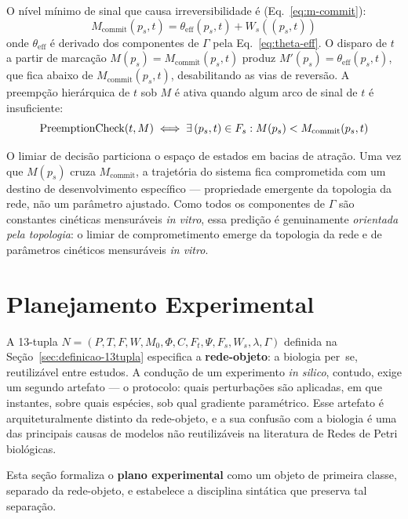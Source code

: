 \begin{definition}
\label{def:limiar-decisao}
O nível mínimo de sinal que causa irreversibilidade é (Eq.~\eqref{eq:m-commit}):
\[
M_{\text{commit}}(p_s, t) = \theta_{\mathrm{eff}}(p_s,t) + W_s((p_s,t))
\]
onde $\theta_{\mathrm{eff}}$ é derivado dos componentes de $\Gamma$ pela
Eq.~\eqref{eq:theta-eff}.
O disparo de $t$ a partir de marcação $M(p_s) = M_{\text{commit}}(p_s,t)$
produz $M'(p_s) = \theta_{\mathrm{eff}}(p_s,t)$, que fica abaixo de
$M_{\text{commit}}(p_s,t)$, desabilitando as vias de reversão.
A preempção hierárquica de $t$ sob $M$ é ativa quando algum arco de sinal
de $t$ é insuficiente:
\[
\operatorname{PreemptionCheck}(t, M) \iff \exists\, (p_s, t) \in F_s : M(p_s) < M_{\text{commit}}(p_s, t)
\]
\end{definition}

O limiar de decisão particiona o espaço de estados em bacias de atração.
Uma vez que $M(p_s)$ cruza $M_{\text{commit}}$, a trajetória do sistema fica
comprometida com um destino de desenvolvimento específico --- propriedade
emergente da topologia da rede, não um parâmetro ajustado.  Como todos os
componentes de $\Gamma$ são constantes cinéticas mensuráveis \emph{in vitro},
essa predição é genuinamente \emph{orientada pela topologia}: o limiar de comprometimento
emerge da topologia da rede e de parâmetros cinéticos mensuráveis \emph{in vitro}.

\section{Planejamento Experimental}
\label{sec:planejamento-experimental}

A 13-tupla $N = (P, T, F, W, M_0, \Phi, C, F_t, \Psi, F_s, W_s, \lambda,
\Gamma)$ definida na Seção~\ref{sec:definicao-13tupla} especifica a
\textbf{rede-objeto}: a biologia per~se, reutilizável entre estudos. A
condução de um experimento \emph{in silico}, contudo, exige um segundo
artefato --- o protocolo: quais perturbações são aplicadas, em que instantes,
sobre quais espécies, sob qual gradiente paramétrico. Esse artefato é
arquiteturalmente distinto da rede-objeto, e a sua confusão com a biologia é
uma das principais causas de modelos não reutilizáveis na literatura de
Redes de Petri biológicas.

Esta seção formaliza o \textbf{plano experimental} como um objeto de primeira
classe, separado da rede-objeto, e estabelece a disciplina sintática que
preserva tal separação.

